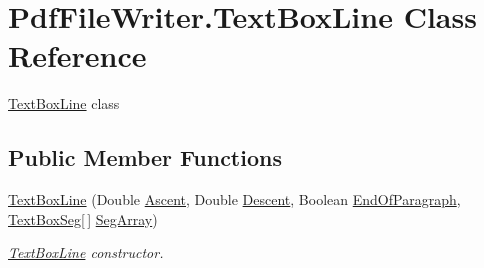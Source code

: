 \hypertarget{class_pdf_file_writer_1_1_text_box_line}{}\section{Pdf\+File\+Writer.\+Text\+Box\+Line Class Reference}
\label{class_pdf_file_writer_1_1_text_box_line}


\hyperlink{class_pdf_file_writer_1_1_text_box_line}{Text\+Box\+Line} class  


\subsection*{Public Member Functions}
\begin{DoxyCompactItemize}
\item 
\hyperlink{class_pdf_file_writer_1_1_text_box_line_a548a8ed94e67627b9ab7389cdb11dfd5}{Text\+Box\+Line} (Double \hyperlink{class_pdf_file_writer_1_1_text_box_line_afd9f78cc965a804d90949cc6248a9ba6}{Ascent}, Double \hyperlink{class_pdf_file_writer_1_1_text_box_line_a7b602f1425dc69a770c29f0edb5ef32b}{Descent}, Boolean \hyperlink{class_pdf_file_writer_1_1_text_box_line_a55fe55c5e4e298c7a4bda8f8b12ace06}{End\+Of\+Paragraph}, \hyperlink{class_pdf_file_writer_1_1_text_box_seg}{Text\+Box\+Seg}\mbox{[}$\,$\mbox{]} \hyperlink{class_pdf_file_writer_1_1_text_box_line_ad11eacb2339dfa2b38412b7988431967}{Seg\+Array})
\begin{DoxyCompactList}\small\item\em \hyperlink{class_pdf_file_writer_1_1_text_box_line}{Text\+Box\+Line} constructor. \end{DoxyCompactList}\end{DoxyCompactItemize}
